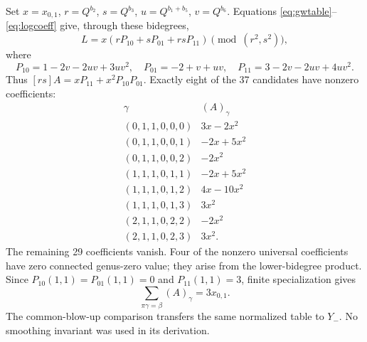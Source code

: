 Set $x=x_{0,1}$, $r=Q^{b_2}$, $s=Q^{b_3}$,
$u=Q^{b_1+b_5}$, $v=Q^{b_6}$. Equations
\eqref{eq:gwtable}--\eqref{eq:logcoeff} give, through these bidegrees,
\[
 L=x(rP_{10}+sP_{01}+rsP_{11})\pmod{(r^2,s^2)},
\]
where
\[
 P_{10}=1-2v-2uv+3uv^2,\quad P_{01}=-2+v+uv,\quad
 P_{11}=3-2v-2uv+4uv^2.
\]
Thus $[rs]A=xP_{11}+x^2P_{10}P_{01}$. Exactly eight of the 37
candidates have nonzero coefficients:
\begin{equation}\label{eq:universal-table}
\begin{array}{c|l}
 \gamma&(A)_\gamma\\ \hline
 (0,1,1,0,0,0)&3x-2x^2\\
 (0,1,1,0,0,1)&-2x+5x^2\\
 (0,1,1,0,0,2)&-2x^2\\
 (1,1,1,0,1,1)&-2x+5x^2\\
 (1,1,1,0,1,2)&4x-10x^2\\
 (1,1,1,0,1,3)&3x^2\\
 (2,1,1,0,2,2)&-2x^2\\
 (2,1,1,0,2,3)&3x^2.
\end{array}
\end{equation}
The remaining 29 coefficients vanish. Four of the nonzero universal
coefficients have zero connected genus-zero value; they arise from
the lower-bidegree product. Since $P_{10}(1,1)=P_{01}(1,1)=0$ and
$P_{11}(1,1)=3$, finite specialization gives
\begin{equation}\label{eq:sum}
 \sum_{\pi\gamma=\beta}(A)_\gamma=3x_{0,1}.
\end{equation}
The common-blow-up comparison transfers the same normalized table
to $Y_-$. No smoothing invariant was used in its derivation.

